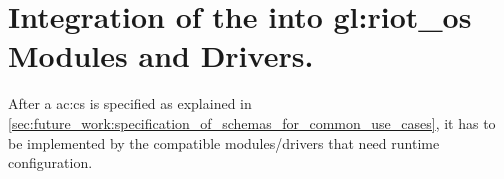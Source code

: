\section{Integration of the  into \gls*{gl:riot_os} Modules and Drivers.}

After a \gls{ac:cs} is specified as explained in \autoref{sec:future_work:specification_of_schemas_for_common_use_cases}, it has to be implemented by the compatible modules/drivers that need runtime configuration.
